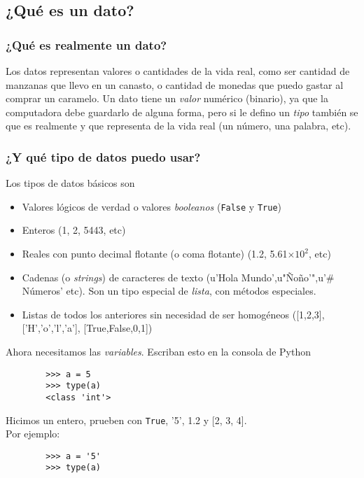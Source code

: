 \documentclass{beamer}
\begin{document}
\subsection{¿Qué es un dato?}
\begin{frame}
    \frametitle{¿Qué es realmente un dato?}
    Los datos representan valores o cantidades de la vida real, como ser cantidad de manzanas que llevo en un canasto, o cantidad de monedas que puedo gastar al comprar un caramelo.
    \vskip11pt
    Un dato tiene un \emph{valor} numérico (binario), ya que la computadora debe guardarlo de alguna forma, pero si le defino un \emph{tipo} también se que es realmente y que representa de la vida real (un número, una palabra, etc).

\end{frame}

\begin{frame}
    \frametitle{¿Y qué tipo de datos puedo usar?}
    Los tipos de datos básicos son
    \begin{itemize}[<+->]
    \item Valores lógicos de verdad o valores \emph{booleanos} (\texttt{False} y \texttt{True})
    \item Enteros (1, 2, 5443, etc)
    \item Reales con punto decimal flotante (o coma flotante) (1.2, 5.61$\times 10^2$, etc)
    \item Cadenas (o \emph{strings}) de caracteres de texto (u'Hola Mundo',u"Ñoño'",u'\# Números' etc). Son un tipo especial de \emph{lista}, con métodos especiales.
    \item Listas de todos los anteriores sin necesidad de ser homogéneos ([1,2,3], ['H','o','l','a'], [True,False,0,1])
    \end{itemize}
\end{frame}

\begin{frame}[fragile]
    Ahora necesitamos las \emph{variables}. Escriban esto en la consola de Python
    \begin{verbatim}
        >>> a = 5
        >>> type(a)
        <class 'int'>
    \end{verbatim}
    Hicimos un entero, prueben con \texttt{True}, '5', 1.2 y [2, 3, 4]. \\Por ejemplo:
    \begin{verbatim}
        >>> a = '5'
        >>> type(a)
    \end{verbatim}
\end{frame}
\end{document}
